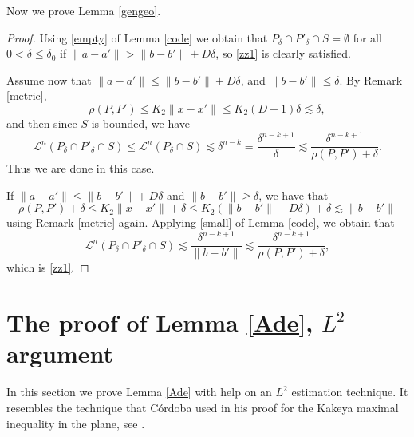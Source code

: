 \documentclass[a4paper]{amsart}
\theoremstyle{definition} \newtheorem{remark}[theorem]{Remark}
\def\de{\delta}
\def\leb{\mathcal{L}}
\def\lkb{\lesssim}
\begin{document}
Now we prove Lemma \ref{gengeo}. 
\begin{proof}
Using \eqref{empty} of Lemma \ref{code} we obtain that $P_{\de} \cap P'_{\de} \cap S= \emptyset$ for all $0 < \de \leq \de_0$
if $\| a-a' \|  > \| b - b' \| + D \de$, so \eqref{zz1} is clearly satisfied. 

Assume now that $\| a-a' \|  \leq \| b - b' \| + D \de$, and $\| b - b' \| \leq \de$. By Remark \ref{metric}, 
$$\rho (P,P') \leq 
K_2 \|x-x' \| \leq K_2 (D+1) \de \lkb \de,$$ 
and then since $S$ is bounded, we have
$$\leb^n(P_{\de} \cap P'_{\de} \cap S) \leq \leb^n(P_{\de} \cap S) \lkb \de^{n-k}=\frac{\de^{n-k+1} }{\de} \lkb \frac{\de^{n-k+1} }{\rho(P,P') + \de}.$$ 
Thus we are done in this case. 

If  $\| a-a' \|  \leq \| b - b' \| + D \de$ and $\|b-b'\| \geq \de$, we have that 
$$\rho (P,P') + \de \leq 
K_2 \|x-x' \| + \de \leq K_2 (\| b - b' \| + D \de)  + \de \lkb \|b-b'\|$$
using Remark \ref{metric} again.
Applying \eqref{small} of Lemma \ref{code}, we obtain that 
$$\leb^n(P_{\de} \cap P'_{\de} \cap S) \lkb \frac{\de^{n-k+1} }{\|b-b'\|} \lkb \frac{\de^{n-k+1} }{\rho(P,P') + \de},$$ 
which is \eqref{zz1}. 

\end{proof}


\section{The proof of Lemma \ref{Ade}, $\mathit{L}^2$ argument}
\label{ll2}

In this section we prove Lemma \ref{Ade} with help on an $\mathit{L}^2$ estimation technique. 
It resembles the technique that C\'ordoba used in his proof for the Kakeya maximal inequality in the plane, see \cite{Co}.  
\end{document}
